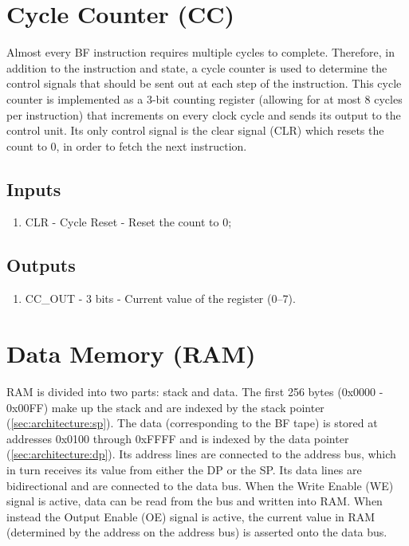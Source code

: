 \section{Cycle Counter (CC)} \label{sec:architecture:cc}
Almost every BF instruction requires multiple cycles to complete. Therefore, in addition to the instruction and state, a cycle counter is used to determine the control signals that should be sent out at each step of the instruction. This cycle counter is implemented as a 3-bit counting register (allowing for at most 8 cycles per instruction) that increments on every clock cycle and sends its output to the control unit. Its only control signal is the clear signal (CLR) which resets the count to 0, in order to fetch the next instruction.

\subsection*{Inputs}
\begin{enumerate}
\itemsep0em
\item CLR - Cycle Reset - Reset the count to 0;
\end{enumerate}

\subsection*{Outputs}
\begin{enumerate}
\itemsep0em
\item CC\_OUT - 3 bits - Current value of the register (0--7).
\end{enumerate}

\section{Data Memory (RAM)}  \label{sec:architecture:ram}
RAM is divided into two parts: stack and data. The first 256 bytes (0x0000 - 0x00FF) make up the stack and are indexed by the stack pointer (\ref{sec:architecture:sp}). The data (corresponding to the BF tape) is stored at addresses 0x0100 through 0xFFFF and is indexed by the data pointer (\ref{sec:architecture:dp}). Its address lines are connected to the address bus, which in turn receives its value from either the DP or the SP. Its data lines are bidirectional and are connected to the data bus. When the Write Enable (WE) signal is active, data can be read from the bus and written into RAM. When instead the Output Enable (OE) signal is active, the current value in RAM (determined by the address on the address bus) is asserted onto the data bus.


